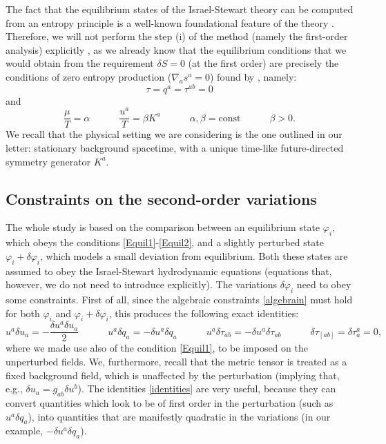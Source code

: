 \documentclass[a4paper, amsfonts, amssymb, amsmath, reprint, showkeys, nofootinbib, twoside, onecolumn,notitlepage]{revtex4-1}
\newcommand{\spc}{\quad \quad \quad}
\begin{document}
The fact that the equilibrium states of the Israel-Stewart theory can be computed from an entropy principle is a well-known foundational feature of the theory \cite{Israel_Stewart_1979}. Therefore, we will not perform the step (i) of the method (namely the first-order analysis) explicitly , as we already know that the equilibrium conditions that we would obtain from the requirement $\delta S=0$ (at the first order) are precisely the conditions of zero entropy production ($\nabla_a s^a = 0$) found by \citet{Hishcock1983}, namely:
\begin{equation}\label{Equil1}
\tau = q^a = \tau^{ab}=0
\end{equation}
and
\begin{equation}\label{Equil2}
\dfrac{\mu}{T} = \alpha  \spc  \dfrac{u^a}{T} = \beta K^a  \spc \alpha,\beta=\text{const}  \spc  \beta>0.
\end{equation}
We recall that the physical setting we are considering is the one outlined in our letter: stationary background spacetime, with a unique time-like future-directed symmetry generator $K^a$.


\subsection{Constraints on the second-order variations}

The whole study is based on the comparison between an equilibrium state $\varphi_i$, which obeys the conditions \eqref{Equil1}-\eqref{Equil2}, and a slightly perturbed state $\varphi_i + \delta \varphi_i$,  which models a small deviation from equilibrium. Both these states are assumed to obey the Israel-Stewart hydrodynamic equations (equations that, however, we do not need to introduce explicitly). The variations $\delta \varphi_i$ need to obey some constraints. First of all, since the algebraic constraints \eqref{algebrain} must hold for both $\varphi_i$ and $\varphi_i + \delta \varphi_i$, this produces the following exact identities:
\begin{equation}\label{identities}
u^a \delta u_a = -\dfrac{\delta u^a \delta u_a}{2}  \spc u^a \delta q_a = -\delta u^a \delta q_a  \spc u^a \delta \tau_{ab} = -\delta u^a \delta \tau_{ab}  \spc  \delta \tau_{[ab]}=\delta \tau^a_a =0 ,
\end{equation}
where we made use also of the condition \eqref{Equil1}, to be imposed on the unperturbed fields. We, furthermore, recall that the metric tensor is treated as a fixed background field, which is unaffected by the perturbation (implying that, e.g., $\delta u_a = g_{ab} \delta u^b$). The identities \eqref{identities} are very useful, because they can convert quantities which look to be of first order in the perturbation (such as $u^a \delta q_a$), into quantities that are manifestly quadratic in the variations (in our example, $-\delta u^a \delta q_a$). 
\end{document}
